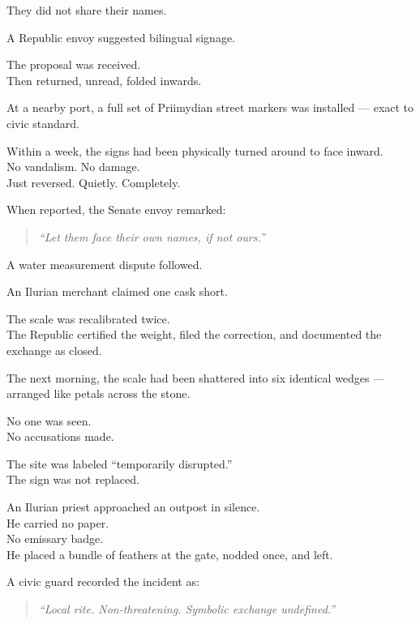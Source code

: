 \documentclass[12pt]{article}
\begin{document}
They did not share their names.

\vspace{1em}

A Republic envoy suggested bilingual signage.

The proposal was received.\\
Then returned, unread, folded inwards.

\vspace{1em}

At a nearby port, a full set of Priimydian street markers was installed — exact to civic standard.

Within a week, the signs had been physically turned around to face inward.\\
No vandalism. No damage.\\
Just reversed. Quietly. Completely.

When reported, the Senate envoy remarked:

\begin{quote}
\textit{“Let them face their own names, if not ours.”}
\end{quote}

\vspace{1em}

A water measurement dispute followed.

An Ilurian merchant claimed one cask short.

The scale was recalibrated twice.\\
The Republic certified the weight, filed the correction, and documented the exchange as closed.

The next morning, the scale had been shattered into six identical wedges — arranged like petals across the stone.

No one was seen.\\
No accusations made.

The site was labeled ``temporarily disrupted.”\\
The sign was not replaced.

\vspace{1em}

An Ilurian priest approached an outpost in silence.\\
He carried no paper.\\
No emissary badge.\\
He placed a bundle of feathers at the gate, nodded once, and left.

A civic guard recorded the incident as:

\begin{quote}
\textit{“Local rite. Non-threatening. Symbolic exchange undefined.”}
\end{quote}
\end{document}
